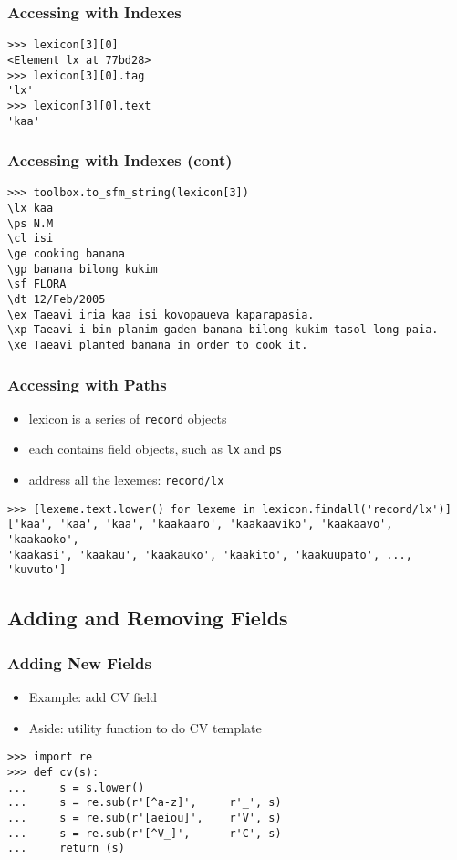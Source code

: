 \documentclass{beamer}             %
\begin{document}
\begin{frame}[fragile]
\frametitle{Accessing with Indexes}

\begin{verbatim}
>>> lexicon[3][0] 
<Element lx at 77bd28>
>>> lexicon[3][0].tag
'lx'
>>> lexicon[3][0].text
'kaa'
\end{verbatim}
\end{frame}

\begin{frame}[fragile]
\frametitle{Accessing with Indexes (cont)}

\scriptsize
\begin{verbatim}
>>> toolbox.to_sfm_string(lexicon[3])
\lx kaa
\ps N.M
\cl isi
\ge cooking banana
\gp banana bilong kukim
\sf FLORA
\dt 12/Feb/2005
\ex Taeavi iria kaa isi kovopaueva kaparapasia.
\xp Taeavi i bin planim gaden banana bilong kukim tasol long paia.
\xe Taeavi planted banana in order to cook it.
\end{verbatim}
\end{frame}

\begin{frame}[fragile]
\frametitle{Accessing with Paths}

\small
\begin{itemize}
\item lexicon is a series of \texttt{record} objects
\item each contains field objects, such as \texttt{lx} and \texttt{ps}
\item address all the lexemes: \texttt{record/lx}
\end{itemize}

\small
\begin{verbatim}
>>> [lexeme.text.lower() for lexeme in lexicon.findall('record/lx')]
['kaa', 'kaa', 'kaa', 'kaakaaro', 'kaakaaviko', 'kaakaavo', 'kaakaoko',
'kaakasi', 'kaakau', 'kaakauko', 'kaakito', 'kaakuupato', ..., 'kuvuto']
\end{verbatim}
\end{frame}

\subsection{Adding and Removing Fields}

\begin{frame}[fragile]
\frametitle{Adding New Fields}
\small

\begin{itemize}
\item Example: add CV field
\item Aside: utility function to do CV template
\end{itemize}

\begin{verbatim}
>>> import re
>>> def cv(s):
...     s = s.lower()
...     s = re.sub(r'[^a-z]',     r'_', s)
...     s = re.sub(r'[aeiou]',    r'V', s)
...     s = re.sub(r'[^V_]',      r'C', s)
...     return (s)
\end{verbatim}
\end{frame}
\end{document}
